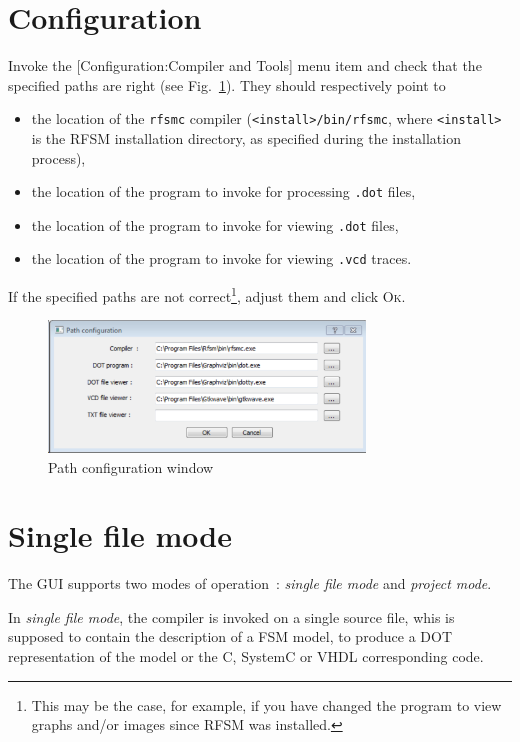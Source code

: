 \section{Configuration}
\label{sec:gui-configuration}

Invoke the [\textsf{Configuration:Compiler and Tools}] menu item and check that the specified paths
are right (see Fig.~\ref{fig:config-window}). They should respectively point to 
\begin{itemize}
\item the location of the \texttt{rfsmc} compiler (\verb|<install>/bin/rfsmc|, where
  \verb|<install>| is the RFSM installation directory, as specified during the installation
  process),
\item the location of the program to invoke for processing \verb|.dot| files, 
\item the location of the program to invoke for viewing \verb|.dot| files, 
\item the location of the program to invoke for viewing \verb|.vcd| traces. 
\end{itemize}
If the specified paths are not correct\footnote{This may be the case, for example, if you have
  changed the program to view graphs and/or images since RFSM was installed.}, adjust them and click \textsc{Ok}.

\begin{figure}[h]
  \centering
  \includegraphics[width=0.75\textwidth]{figs/gui/pathconfig}
  \caption{Path configuration window}
  \label{fig:config-window}
\end{figure}

\section{Single file mode}
\label{sec:gui-single-file-mode}

The GUI supports two modes of operation~: \emph{single file mode} and \emph{project mode}. 

\medskip
In \emph{single file mode}, the compiler is invoked on a single source file, whis is supposed to
contain the description of a FSM model, to produce a DOT representation of the model or the C,
SystemC or VHDL corresponding code.

